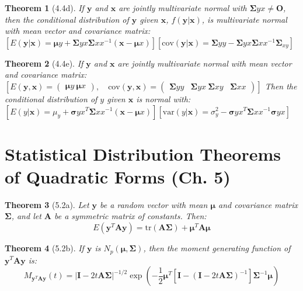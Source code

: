 \documentclass{article}
\newtheorem{theorem}{Theorem}[section]
\begin{document}
\begin{theorem}[4.4d]
If $\mathbf{y}$ and $\mathbf{x}$ are jointly multivariate normal with $\boldsymbol{\Sigma}{yx} \neq \mathbf{O}$, then the conditional distribution of $\mathbf{y}$ given $\mathbf{x}$, $f(\mathbf{y}|\mathbf{x})$, is multivariate normal with mean vector and covariance matrix:
$[E(\mathbf{y}|\mathbf{x}) = \boldsymbol{\mu}y + \boldsymbol{\Sigma}{yx}\boldsymbol{\Sigma}{xx}^{-1}(\mathbf{x} - \boldsymbol{\mu}x)]
[\text{cov}(\mathbf{y}|\mathbf{x}) = \boldsymbol{\Sigma}{yy} - \boldsymbol{\Sigma}{yx}\boldsymbol{\Sigma}{xx}^{-1}\boldsymbol{\Sigma}_{xy}]$
\end{theorem}

\begin{theorem}[4.4e]
If $\mathbf{y}$ and $\mathbf{x}$ are jointly multivariate normal with mean vector and covariance matrix:
$[E(\mathbf{y}, \mathbf{x}) = \begin{pmatrix} \boldsymbol{\mu}y \ \boldsymbol{\mu}x \end{pmatrix}, \quad
\text{cov}(\mathbf{y}, \mathbf{x}) = \begin{pmatrix} \boldsymbol{\Sigma}{yy} & \boldsymbol{\Sigma}{yx} \ \boldsymbol{\Sigma}{xy} & \boldsymbol{\Sigma}{xx} \end{pmatrix}]$
Then the conditional distribution of $y$ given $\mathbf{x}$ is normal with:
$[E(y|\mathbf{x}) = \mu_y + \boldsymbol{\sigma}{yx}^T\boldsymbol{\Sigma}{xx}^{-1}(\mathbf{x} - \boldsymbol{\mu}x)]
[\text{var}(y|\mathbf{x}) = \sigma_y^2 - \boldsymbol{\sigma}{yx}^T\boldsymbol{\Sigma}{xx}^{-1}\boldsymbol{\sigma}{yx}]$
\end{theorem}


\section{Statistical Distribution Theorems of Quadratic Forms (Ch. 5)}

\begin{theorem}[5.2a]
Let $\mathbf{y}$ be a random vector with mean $\boldsymbol{\mu}$ and covariance matrix $\boldsymbol{\Sigma}$, and let $\mathbf{A}$ be a symmetric matrix of constants. Then:
\[E(\mathbf{y}^T \mathbf{A} \mathbf{y}) = \text{tr}(\mathbf{A}\boldsymbol{\Sigma}) + \boldsymbol{\mu}^T \mathbf{A} \boldsymbol{\mu}\]
\end{theorem}
\begin{theorem}[5.2b]
If $\mathbf{y}$ is $N_p(\boldsymbol{\mu}, \boldsymbol{\Sigma})$, then the moment generating function of $\mathbf{y}^T\mathbf{A}\mathbf{y}$ is:
\[M_{\mathbf{y}^T\mathbf{A}\mathbf{y}}(t) = |\mathbf{I} - 2t\mathbf{A}\boldsymbol{\Sigma}|^{-1/2}\exp\left(-\frac{1}{2}\boldsymbol{\mu}^T[\mathbf{I} - (\mathbf{I} - 2t\mathbf{A}\boldsymbol{\Sigma})^{-1}]\boldsymbol{\Sigma}^{-1}\boldsymbol{\mu}\right)\]
\end{theorem}
\end{document}
